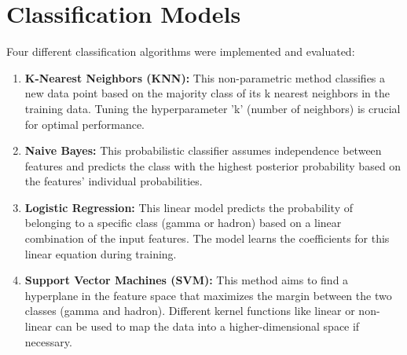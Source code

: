 \section{Classification Models}

Four different classification algorithms were implemented and evaluated:

\begin{enumerate}
    \item \textbf{K-Nearest Neighbors (KNN):} This non-parametric method
    classifies a new data point based on the majority class of its k nearest
    neighbors in the training data. Tuning the hyperparameter 'k' (number of
    neighbors) is crucial for optimal performance.
    \item \textbf{Naive Bayes:} This probabilistic classifier assumes
    independence between features and predicts the class with the highest
    posterior probability based on the features' individual probabilities.
    \item \textbf{Logistic Regression:} This linear model predicts the
    probability of belonging to a specific class (gamma or hadron) based on a
    linear combination of the input features. The model learns the coefficients
    for this linear equation during training.
    \item \textbf{Support Vector Machines (SVM):} This method aims to find a
    hyperplane in the feature space that maximizes the margin between the two
    classes (gamma and hadron). Different kernel functions like linear or
    non-linear can be used to map the data into a higher-dimensional space if
    necessary.
\end{enumerate}
